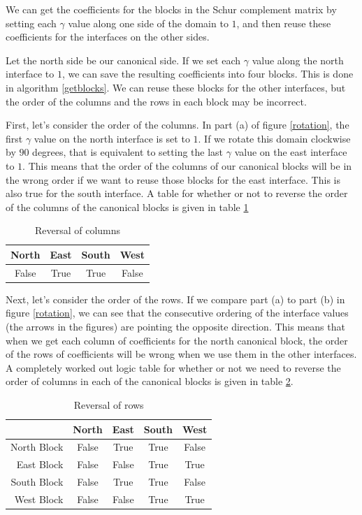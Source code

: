 \documentclass[12pt]{article}
\begin{document}
We can get the coefficients for the blocks in the Schur complement matrix by
setting each $\gamma$ value along one side of the domain to $1$, and then reuse these coefficients 
for the interfaces on the other sides.

Let the north side be our canonical side. If we set each $\gamma$ value along the north interface to
$1$, we can save the resulting coefficients into four blocks. This is done in algorithm
\ref{getblocks}. We can reuse these blocks for the other interfaces, but the order of the columns 
and the rows in each block may be incorrect.

First, let's consider the order of the columns.
In part (a) of figure \ref{rotation}, the
first $\gamma$ value on the north interface is set to $1$. If we rotate this domain clockwise by $90$
degrees, that is equivalent to setting the last $\gamma$ value on the east interface to $1$. This
means that the order of the columns of our canonical blocks will be in the wrong order if we want to
reuse those blocks for the east interface. This is also true for the south interface. A table for
whether or not to reverse the order of the columns of the canonical blocks is given in table \ref{revcol} 
\begin{table}[H]
    \centering
\begin{tabular}{ cccc }
                   North & East & South & West \\ \hline
     False & True & True & False \\
\end{tabular}
    \caption{Reversal of columns}
    \label{revcol}
\end{table}
Next, let's consider the order of the rows. If we compare part (a) to part (b) in figure
\ref{rotation}, we can see that the consecutive ordering of the interface values (the arrows in
the figures) are pointing the opposite direction. This means that when we get each column of
coefficients for the north canonical block, the order of the rows of coefficients will be wrong when
we use them in the other interfaces. A completely worked out logic table for whether or not we need
to reverse the order of columns in each of the canonical blocks is given in table \ref{revrow}.
\begin{table}[H]
    \centering
\begin{tabular}{ r | cccc }
                  & North & East  & South & West \\ \hline
    North Block   & False & True  & True & False \\
    East  Block   & False & False & True & True  \\
    South Block   & False & True  & True & False \\
    West  Block   & False & False & True & True  \\
\end{tabular}
    \caption{Reversal of rows}
    \label{revrow}
\end{table}
\end{document}
